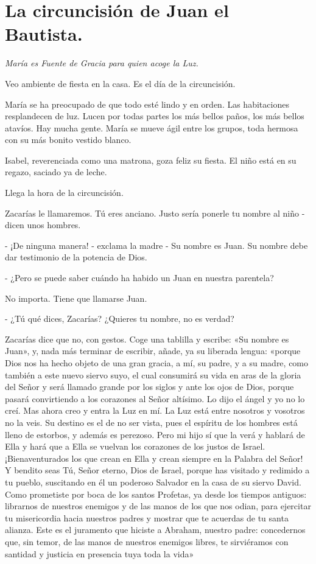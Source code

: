 \documentclass[12pt]{book} %
\begin{document}
\chapter{La circuncisión de Juan el Bautista. }

\emph{María es Fuente de Gracia para quien acoge la Luz. }
 
Veo ambiente de fiesta en la casa. Es el día de la circuncisión. 

María se ha preocupado de que todo esté lindo y en orden. Las habitaciones resplandecen de luz. Lucen por todas partes los más bellos paños, los más bellos atavíos. Hay mucha gente. María se mueve ágil entre los grupos, toda hermosa con su más bonito vestido blanco. 

Isabel, reverenciada como una matrona, goza feliz su fiesta. El niño está en su regazo, saciado ya de leche. 

Llega la hora de la circuncisión. 

Zacarías le llamaremos. Tú eres anciano. Justo sería ponerle tu nombre al niño - dicen unos hombres. 

- ¡De ninguna manera! - exclama la madre - Su nombre es Juan. Su nombre debe dar testimonio de la potencia de Dios. 

- ¿Pero se puede saber cuándo ha habido un Juan en nuestra parentela? 

No importa. Tiene que llamarse Juan. 

- ¿Tú qué dices, Zacarías? ¿Quieres tu nombre, no es verdad? 

Zacarías dice que no, con gestos. Coge una tablilla y escribe: «Su nombre es Juan», y, nada más terminar de escribir, añade, ya su liberada lengua: «porque Dios nos ha hecho objeto de una gran gracia, a mí, su padre, y a su madre, como también a este nuevo siervo suyo, el cual consumirá su vida en aras de la gloria del Señor y será llamado grande por los siglos y ante los ojos de Dios, porque pasará convirtiendo a los corazones al Señor altísimo. Lo dijo el ángel y yo no lo creí. Mas ahora creo y entra la Luz en mí. La Luz está entre nosotros y vosotros no la veis. Su destino es el de no ser vista, pues el espíritu de los hombres está lleno de estorbos, y además es perezoso. Pero mi hijo sí que la verá y hablará de Ella y hará que a Ella se vuelvan los corazones de los justos de Israel. ¡Bienaventurados los que crean en Ella y crean siempre en la Palabra del Señor! Y bendito seas Tú, Señor eterno, Dios de Israel, porque has visitado y redimido a tu pueblo, suscitando en él un poderoso Salvador en la casa de su siervo David. Como prometiste por boca de los santos Profetas, ya desde los tiempos antiguos: librarnos de nuestros enemigos y de las manos de los que nos odian, para ejercitar tu misericordia hacia nuestros padres y mostrar que te acuerdas de tu santa alianza. Este es el juramento que hiciste a Abraham, nuestro padre: concedernos que, sin temor, de las manos de nuestros enemigos libres, te sirviéramos con santidad y justicia en presencia tuya toda la vida» 
\end{document}
